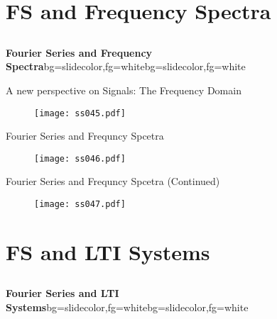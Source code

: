 \section{FS and Frequency Spectra}
\subsection{}
\begin{frame}{}
\begin{variableblock}{\centering \Large \textbf{\vspace{4pt}\newline Fourier Series and Frequency Spectra\vspace{4pt}}}{bg=slidecolor,fg=white}{bg=slidecolor,fg=white}
\end{variableblock}
\end{frame}

\begin{frame}{A new perspective on Signals: The Frequency Domain}
\begin{figure}
\centering
\texttt{[image: ss045.pdf]}
\end{figure}
\end{frame}

\begin{frame}{Fourier Series and Frequncy Spcetra}
\begin{figure}
\centering
\texttt{[image: ss046.pdf]}
\end{figure}
\end{frame}

\begin{frame}{Fourier Series and Frequncy Spcetra (Continued)}
\begin{figure}
\centering
\texttt{[image: ss047.pdf]}
\end{figure}
\end{frame}

\section{FS and LTI Systems}
\subsection{}
\begin{frame}{}
\begin{variableblock}{\centering \Large \textbf{\vspace{4pt}\newline Fourier Series and LTI Systems\vspace{4pt}}}{bg=slidecolor,fg=white}{bg=slidecolor,fg=white}
\end{variableblock}
\end{frame}


